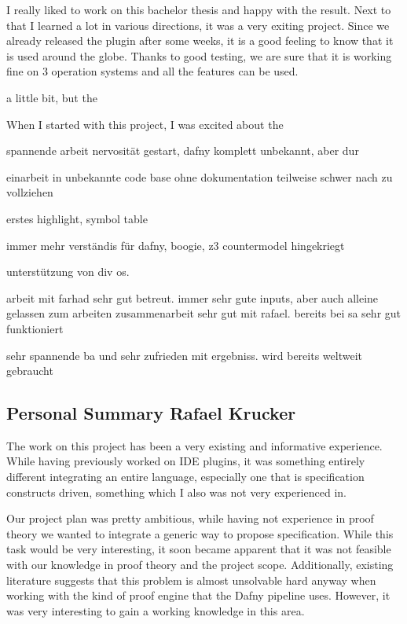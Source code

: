 I really liked to work on this bachelor thesis and happy with the result. Next to that I learned a lot in various directions, it was a very exiting project. Since we already released the plugin after some weeks, it is a good feeling to know that it is used around the globe. Thanks to good testing, we are sure that it is working fine on 3 operation systems and all the features can be used.  


  a little bit, but the 

When I started with this project, I was excited about the 

spannende arbeit
nervosität gestart, dafny komplett unbekannt, aber dur

einarbeit in unbekannte code base ohne dokumentation
teilweise schwer nach zu vollziehen

erstes highlight, symbol table

immer mehr verständis für dafny, boogie, z3
countermodel hingekriegt

unterstützung von div os. 


arbeit mit farhad sehr gut betreut. immer sehr gute inputs, aber auch alleine gelassen zum arbeiten
zusammenarbeit sehr gut mit rafael. bereits bei sa sehr gut funktioniert

sehr spannende ba und sehr zufrieden mit ergebniss. wird bereits weltweit gebraucht


\subsection{Personal Summary Rafael Krucker}
The work on this project has been a very existing and informative experience. While having previously worked on IDE plugins, it was something entirely different integrating an entire language, especially one that is specification constructs driven, something which I also was not very experienced in. \newline

Our project plan was pretty ambitious, while having not experience in proof theory we wanted to integrate a generic way to propose specification. While this task would be very interesting, it soon became apparent that it was not feasible with our knowledge in proof theory and the project scope. Additionally, existing literature suggests that this problem is almost unsolvable hard anyway when working with the kind of proof engine that the Dafny pipeline uses. However, it was very interesting to gain a working knowledge in this area. \newline

